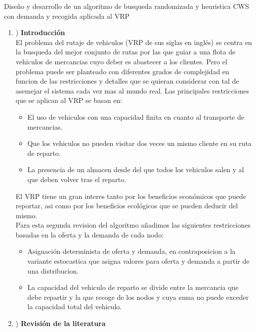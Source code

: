 \documentclass[11pt]{article} %
\begin{document}
\clearpage

{\fontsize{50}{60}\selectfont Diseño y desarrollo de un algoritmo de busqueda randomizada y heuristica CWS con demanda y recogida aplicada al VRP}

\renewcommand{\labelenumi}{\arabic{enumi}}
 \begin{enumerate}
   \item) \textbf{Introducción}\\[0.2cm]
El problema del rutaje de vehiculos (VRP de sus siglas en inglés) se centra en la busqueda del mejor conjunto de rutas por las que guiar a una flota de vehiculos de mercancias cuyo deber es abastecer a los clientes. Pero el problema puede ser planteado con diferentes grados de complejidad en funcion de las restricciones y detalles que se quieran considerar con tal de asemejar el sistema cada vez mas al mundo real. Las principales restricciones que se aplican al VRP se basan en:
   \begin{itemize}
       \item El uso de vehiculos con una capacidad finita en cuanto al transporte de mercancias.
       \item Que los vehiculos no pueden visitar dos veces un mismo cliente en su ruta de reparto.
       \item La presencia de un almacen desde del que todos los vehiculos salen y al que deben volver tras el reparto.
   \end{itemize} 
El VRP tiene un gran interes tanto por los beneficios económicos que puede reportar, asi como por los beneficios ecológicos que se pueden deducir del mismo.\\

Para esta segunda revision del algoritmo añadimos las siguientes restricciones basadas en la oferta y la demanda de cada nodo:
   \begin{itemize}
       \item Asignación determinista de oferta y demanda, en contraposicion a la variante estocastica que asigna valores para oferta y demanda a partir de una distribucion.
	\item La capacidad del vehiculo de reparto se divide entre la mercancia que debe repartir y la que recoge de los nodos y cuya suma no puede exceder la capacidad total del vehiculo.
   \end{itemize} 

   \item) \textbf{Revisión de la literatura}\\[0.2cm]


\end{enumerate}
\end{document}
